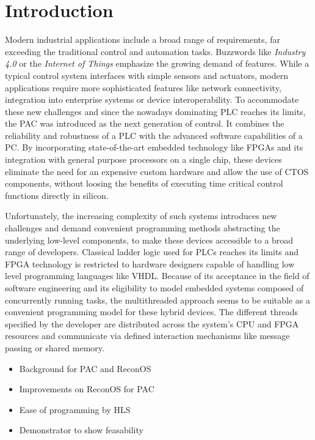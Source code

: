 \chapter{Introduction}

Modern industrial applications include a broad range of requirements, far
exceeding the traditional control and automation tasks. Buzzwords like
\emph{Industry 4.0} or the \emph{Internet of Things} emphasize the growing
demand of features. While a typical control system interfaces with simple
sensors and actuators, modern applications require more sophisticated features
like network connectivity, integration into enterprise systems or device
interoperability. To accommodate these new challenges and since the nowadays
dominating \ac{PLC} reaches its limits, the \ac{PAC} was introduced as the
next generation of control. It combines the reliability and robustness of a
\ac{PLC} with the advanced software capabilities of a \ac{PC}. By
incorporating state-of-the-art embedded technology like \acp{FPGA} and its
integration with general purpose processors on a single chip, these devices
eliminate the need for an expensive custom hardware and allow  the use of
\ac{CTOS} components, without loosing the benefits of executing time critical
control functions directly in silicon.

Unfortunately, the increasing complexity of such systems introduces new
challenges and demand convenient programming methods abstracting the
underlying low-level components, to make these devices accessible to a broad
range of developers. Classical ladder logic used for \acp{PLC} reaches its
limits and \ac{FPGA} technology is restricted to hardware designers capable of
handling low level programming languages like \ac{VHDL}. Because of its
acceptance in the field of software engineering and its eligibility to model
embedded systems composed of concurrently running tasks, the multithreaded
approach seems to be suitable as a convenient programming model for these
hybrid devices. The different threads specified by the developer are
distributed across the system's \ac{CPU} and \ac{FPGA} resources and
communicate via defined interaction mechanisms like message passing or shared
memory.

\begin{itemize}
\item Background for PAC and ReconOS
\item Improvements on ReconOS for PAC
\item Ease of programming by HLS
\item Demonstrator to show feasability
\end{itemize}
